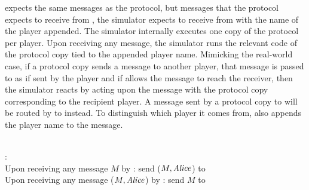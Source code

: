 \simulator{} expects the same messages as the protocol, but messages that the
protocol expects to receive from \environment, the simulator expects to receive
from \fpaynet{} with the name of the player appended. The simulator internally
executes one copy of the protocol per player. Upon receiving any message, the
simulator runs the relevant code of the protocol copy tied to the appended
player name. Mimicking the real-world case, if a protocol copy sends a message
to another player, that message is passed to \adversary{} as if sent by the
player and if \adversary{} allows the message to reach the receiver, then the
simulator reacts by acting upon the message with the protocol copy corresponding
to the recipient player. A message sent by a protocol copy to \environment{}
will be routed by \simulator{} to \fpaynet{} instead. To distinguish which
player it comes from, \simulator{} also appends the player name to the message.

\noindent \hrulefill \\
\fpaynet{}: \\
Upon receiving any message $M$ by \alice: send ($M, \mathit{Alice}$) to \simulator \\
Upon receiving any message ($M, \mathit{Alice}$) by \simulator: send $M$ to \alice
